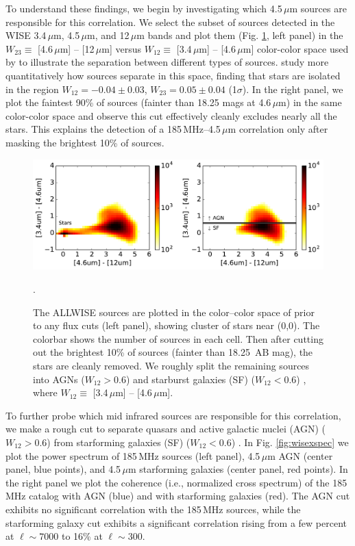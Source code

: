 \documentclass[numberedappendix]{emulateapj}
\begin{document}
To understand these findings, we begin by investigating which 4.5\,$\mu$m sources are responsible for this correlation. We select the subset of sources detected in the WISE 3.4\,$\mu$m, 4.5\,$\mu$m, and 12\,$\mu$m bands and plot them (Fig. \ref{fig:wisecolorcolor}, left panel) in the $W_{23}\equiv$ [4.6\,$\mu$m] -- [12\,$\mu$m] versus $W_{12}\equiv$ [3.4\,$\mu$m] -- [4.6\,$\mu$m] color-color space used by \citet{Wright2010} to illustrate the separation between different types of sources. \citet{nikutta14} study more quantitatively how sources separate in this space, finding that stars are isolated in the region $W_{12}=-0.04\pm0.03$, $W_{23}=0.05\pm0.04$ (1$\sigma$). In the right panel, we plot the faintest 90\% of sources (fainter than 18.25 mags at 4.6\,$\mu$m) in the same color-color space and observe this cut effectively cleanly excludes nearly all the stars. This explains the detection of a 185\,MHz--4.5\,$\mu$m correlation only after masking the brightest 10\% of sources. 

\begin{figure}[h]
\centering
\includegraphics[width=6in]{wise_color_color_figure_max=1e-3_5Jy.pdf}
\caption[Color-color plots of ALLWISE sources showing that cutting out the brightest 10\% cleanly removes the stars.]{The ALLWISE sources are plotted in the color--color space of \citet{Wright2010} prior to any flux cuts (left panel), showing cluster of stars near (0,0). The colorbar shows the number of sources in each cell. Then after cutting out the brightest 10\% of sources (fainter than 18.25\, AB mag), the stars are cleanly removed. We roughly split the remaining sources into AGNs ($W_{12}>0.6$) and starburst galaxies (SF) ($W_{12}<0.6$) \citep{mingo16}, where  $W_{12}\equiv$ [3.4\,$\mu$m] -- [4.6\,$\mu$m].}.
\label{fig:wisecolorcolor}
\end{figure}

To further probe which mid infrared sources are responsible for this correlation, we make a rough cut to separate quasars and active galactic nuclei (AGN) ($W_{12}>0.6$) from starforming galaxies (SF) ($W_{12}<0.6$) \citep{mingo16}. In Fig. \ref{fig:wisexspec} we plot the power spectrum of 185\,MHz sources (left panel), 4.5\,$\mu$m AGN (center panel, blue points), and 4.5\,$\mu$m starforming galaxies (center panel, red points). In the right panel we plot the coherence (i.e., normalized cross spectrum) of the 185\,MHz catalog with AGN (blue) and with starforming galaxies (red). The AGN cut exhibits no significant correlation with the 185\,MHz sources, while the starforming galaxy cut exhibits a significant correlation rising from a few percent at $\ell\sim7000$ to 16\% at $\ell\sim300$. 
\end{document}
